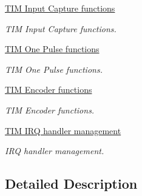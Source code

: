 \begin{DoxyCompactItemize}
\hyperlink{group___t_i_m___exported___functions___group4}{T\+I\+M Input Capture functions}
\begin{DoxyCompactList}\small\item\em T\+IM Input Capture functions. \end{DoxyCompactList}\item 
\hyperlink{group___t_i_m___exported___functions___group5}{T\+I\+M One Pulse functions}
\begin{DoxyCompactList}\small\item\em T\+IM One Pulse functions. \end{DoxyCompactList}\item 
\hyperlink{group___t_i_m___exported___functions___group6}{T\+I\+M Encoder functions}
\begin{DoxyCompactList}\small\item\em T\+IM Encoder functions. \end{DoxyCompactList}\item 
\hyperlink{group___t_i_m___exported___functions___group7}{T\+I\+M I\+R\+Q handler management}
\begin{DoxyCompactList}\small\item\em I\+RQ handler management. \end{DoxyCompactList}\end{DoxyCompactItemize}


\subsection{Detailed Description}
